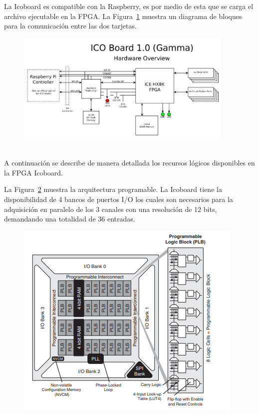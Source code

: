 La Icoboard es compatible con la Raspberry, es por medio de esta que se carga el archivo ejecutable en la FPGA. La Figura~\ref{Compatilidad} muestra un diagrama de bloques para la comunicación entre las dos tarjetas. 

\begin{figure}[h]
\includegraphics[width=0.93\textwidth]{Figs/icogama.PNG} 
\centering
\caption[Compatibilidad con la Raspberry]{~\citep{IcoBoard}}
\label{Compatilidad}
\end{figure}

A continuación se describe de manera detallada los recursos lógicos disponibles en la FPGA Icoboard.

La Figura~\ref{arquitectura}  muestra la arquitectura programable. La Icoboard tiene la disponibilidad de 4 bancos de puertos I/O los cuales son necesarios para la adquisición en paralelo de los 3 canales con una resolución de 12 bits, demandando una totalidad de 36 entradas. 


\begin{figure}[H]
\includegraphics[scale=1.2]{Figs/architecture.PNG} 
\centering
\caption[Arquitectura iCE40]{~\citep{LatticeSemiconductor2017}}
\label{arquitectura}
\end{figure}

